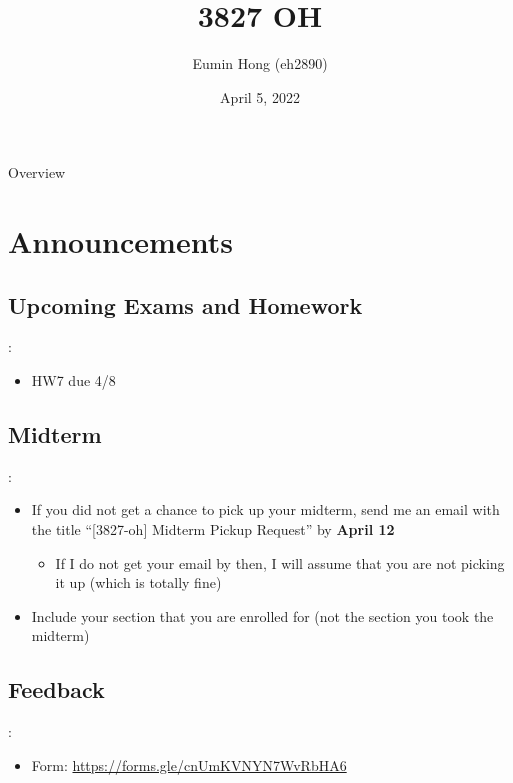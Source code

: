 \documentclass{../slides}
\title{3827 OH}
\author{Eumin Hong (eh2890)}
\institute{Columbia University}
\date{April 5, 2022}
\begin{document}
\begin{frame}
    \titlepage
\end{frame}

\begin{frame}{Overview}
\begin{multicols}{2}
\tableofcontents
\end{multicols}
\end{frame}

\section{Announcements}
\subsection{Upcoming Exams and Homework}
\begin{frame}{\secname: \subsecname}
    \begin{itemize}
        \item HW7 due 4/8
    \end{itemize}
\end{frame}

\subsection{Midterm}
\begin{frame}{\secname: \subsecname}
    \begin{itemize}
        \item If you did not get a chance to pick up your midterm, send me an email with the title \enquote{[3827-oh] Midterm Pickup Request} by \textbf{April 12}
        \begin{itemize}
            \item If I do not get your email by then, I will assume that you are not picking it up (which is totally fine)
        \end{itemize}
        \item Include your section that you are enrolled for (not the section you took the midterm)
    \end{itemize}
\end{frame}

\subsection{Feedback}
\begin{frame}{\secname: \subsecname}
    \begin{itemize}
        \item Form: \url{https://forms.gle/cnUmKVNYN7WvRbHA6}
    \end{itemize}
\end{frame}
\end{document}
